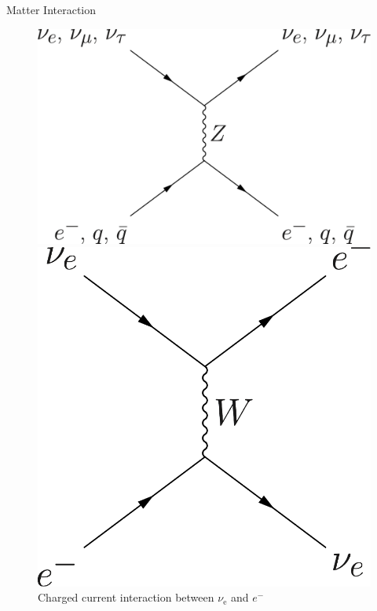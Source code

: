 \documentclass[9pt]{beamer}
\begin{document}
\begin{darkframes}
\begin{frame}{Matter Interaction}
\begin{tcolorbox}
\begin{figure}[ht]
\centering
\begin{minipage}[b]{0.45\linewidth}
\centering
\includegraphics[height=0.32\textheight]{assets/neutral-current.png}
\caption*{\color{black}Neutral current interaction between $\nu_{\mathrm e}$, $\nu_{\mu}$, $\nu_{\tau}$,
and $e^{-}$, etc.}
\end{minipage}%
\begin{minipage}[b]{0.45\linewidth}
\centering
\includegraphics[height=0.32\textheight]{assets/charged-current.png}
\caption*{
\color{black}Charged current interaction between $\nu_{\mathrm e}$ and $e^{-}$}
\end{minipage}
\end{figure}


\end{tcolorbox}
\end{frame}
\end{darkframes}
\end{document}
